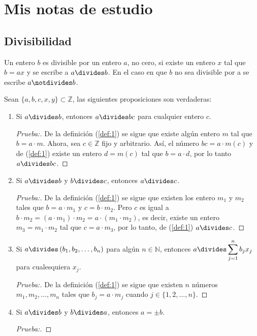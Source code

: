 \chapter*{Mis notas de estudio}
\section*{Divisibilidad}

\begin{definition}
Un entero $b$ es divisible por un entero $a$, no cero, si existe un entero $x$ tal que $b=ax$ y se escribe a $a\divides b$. En el caso en que $b$ no sea divisible por a se escribe $a\notdivides b$.
\end{definition}

\begin{theorem}
\noindent
Sean $\{a,b,c,x,y\}\subset\mathbb{Z}$, las siguientes proposiciones son verdaderas:
\begin{enumerate}[font={\bfseries},label={1)}]\label{def:1}
	\item Si $a\divides b$, entonces $a\divides bc$ para cualquier entero $c$.
	
	\begin{proof}[Prueba:]
	\noindent
	
	De la definición (\ref{def:1}) se sigue que existe algún entero $m$ tal que $b=a\cdot m$. Ahora, sea $c\in\mathbb{Z}$ fijo y arbitrario. Así, el número $bc=a\cdot m(c)$ y de (\ref{def:1}) existe un entero $d=m(c)$ tal que $b=a\cdot d$, por lo tanto $a\divides bc$.
	\end{proof}

	\item Si $a\divides b$ y $b\divides c$, entonces $a\divides c$.
	
	\begin{proof}[Prueba:]
	\noindent
	
	De la definición (\ref{def:1}) se sigue que existen los entero $m_1$ y $m_2$ tales que $b=a\cdot m_1$ y $c=b\cdot m_2$. Pero $c$ es igual a $b\cdot m_2=(a\cdot m_1)\cdot m_2=a\cdot(m_1\cdot m_2)$, es decir, existe un entero $m_3=m_1\cdot m_2$ tal que $c=a\cdot m_3$, por lo tanto, de (\ref{def:1}) $a\divides c$. 
	\end{proof}

	\item Si $a\divides \left(b_1,b_2,\ldots,b_n\right)$ para algún $n\in\mathbb{N}$, entonces $a\divides \displaystyle\sum_{j=1}^{n}b_jx_j$ para cualesquiera $x_j$.
	
	\begin{proof}[Prueba:]
	\noindent
	
	De la definición (\ref{def:1}) se sigue que existen $n$ números $m_1,m_2,\ldots, m_n$ tales que $b_j=a\cdot m_j$ cuando $j\in\{1,2,\ldots,n\}$.
	\end{proof}

	\item Si $a\divides b$ y $b\divides a$, entonces $a=\pm b$.
	
	\begin{proof}[Prueba:]
	\noindent
	
	\end{proof}
\end{enumerate}
\end{theorem}

